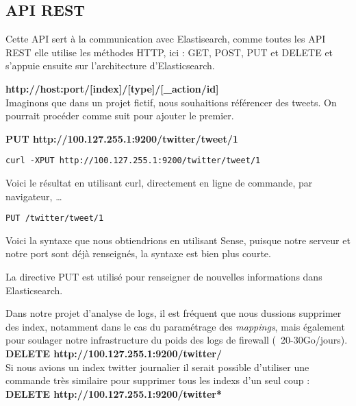 \subsection{API REST}
Cette API sert à la communication avec Elastisearch, comme toutes les API REST elle
utilise les méthodes HTTP, ici : GET, POST, PUT et DELETE et s'appuie ensuite sur l'architecture d'Elasticsearch.

\textbf{{\color{grey}http://host:port}/[{\color{red}index}]/[{\color{cyan}type}]/[{\color{yellow}\_action/id}]}\\[5mm]
Imaginons que dans un projet fictif, nous souhaitions référencer des tweets.
On pourrait procéder comme suit pour ajouter le premier.

\textbf{PUT  {\color{grey} http://100.127.255.1:9200}/{\color{red}twitter}/{\color{cyan}tweet}/{\color{yellow}1}}

\begin{lstlisting}[style=code,label={lst:RESTexemple1curl},caption={Avec curl}]
curl -XPUT http://100.127.255.1:9200/twitter/tweet/1
\end{lstlisting}
Voici le résultat en utilisant curl, directement en ligne de commande, par 
navigateur, \ldots

\begin{lstlisting}[style=code,label={lst:RESTexemple1sense},caption={Avec Sense}]
PUT /twitter/tweet/1
\end{lstlisting}

Voici la syntaxe que nous obtiendrions en utilisant Sense, puisque notre serveur 
et notre port sont déjà renseignés, la syntaxe est bien plus courte.

La directive PUT est utilisé pour renseigner de nouvelles informations dans Elasticsearch.


Dans notre projet d'analyse de logs, il est fréquent que nous dussions supprimer 
des index, notamment dans le cas du paramétrage des \emph{mappings}, mais également
pour soulager notre infrastructure du poids des logs de firewall (~20-30Go/jours).\\

\textbf{DELETE  {\color{grey} http://100.127.255.1:9200}/{\color{red}twitter}/}\\

Si nous avions un index twitter journalier il serait possible d'utiliser une commande
très similaire pour supprimer tous les indexs d'un seul coup :\\

\textbf{DELETE  {\color{grey} http://100.127.255.1:9200}/{\color{red}twitter*}}\\


